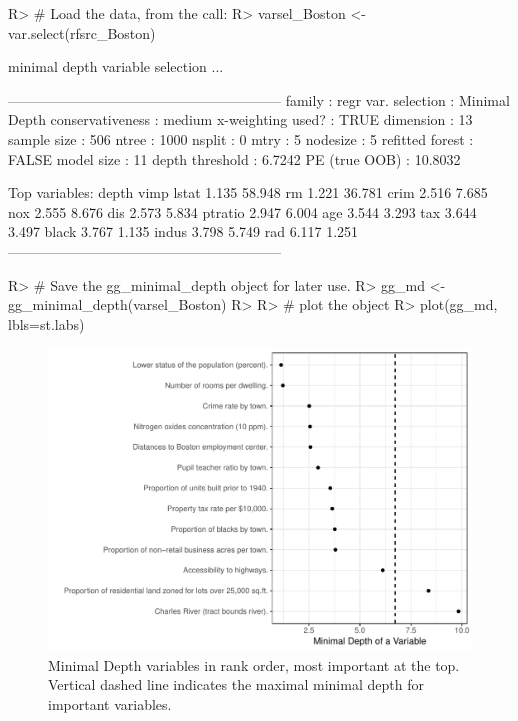 \documentclass[article]{jss}
\begin{document}
\begin{CodeChunk}

\begin{CodeInput}
R> # Load the data, from the call:
R> varsel_Boston <- var.select(rfsrc_Boston)
\end{CodeInput}

\begin{CodeOutput}
minimal depth variable selection ...


-----------------------------------------------------------
family             : regr 
var. selection     : Minimal Depth 
conservativeness   : medium 
x-weighting used?  : TRUE 
dimension          : 13 
sample size        : 506 
ntree              : 1000 
nsplit             : 0 
mtry               : 5 
nodesize           : 5 
refitted forest    : FALSE 
model size         : 11 
depth threshold    : 6.7242 
PE (true OOB)      : 10.8032 


Top variables:
        depth   vimp
lstat   1.135 58.948
rm      1.221 36.781
crim    2.516  7.685
nox     2.555  8.676
dis     2.573  5.834
ptratio 2.947  6.004
age     3.544  3.293
tax     3.644  3.497
black   3.767  1.135
indus   3.798  5.749
rad     6.117  1.251
-----------------------------------------------------------
\end{CodeOutput}

\begin{CodeInput}
R> # Save the gg_minimal_depth object for later use.
R> gg_md <- gg_minimal_depth(varsel_Boston)
R> 
R> # plot the object
R> plot(gg_md, lbls=st.labs)
\end{CodeInput}
\begin{figure}

{\centering \includegraphics{Regression-rfsrc_files/figure-latex/minimaldepth-1} 

}

\caption[Minimal Depth variables in rank order, most important at the top]{Minimal Depth variables in rank order, most important at the top. Vertical dashed line indicates the maximal minimal depth for important variables.}\label{fig:minimaldepth}
\end{figure}
\end{CodeChunk}
\end{document}
